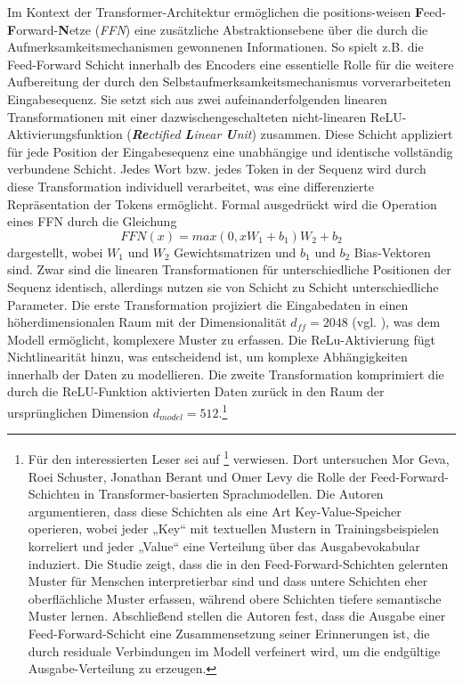 Im Kontext der Transformer-Architektur ermöglichen die positions-weisen \textbf{F}eed-\textbf{F}orward-\textbf{N}etze (\emph{FFN}) eine zusätzliche Abstraktionsebene über die durch die Aufmerksamkeitsmechanismen gewonnenen Informationen. So spielt z.B. die Feed-Forward Schicht innerhalb des Encoders eine essentielle Rolle für die weitere Aufbereitung der durch den Selbstaufmerksamkeitsmechanismus vorverarbeiteten Eingabesequenz. Sie setzt sich aus zwei aufeinanderfolgenden linearen Transformationen mit einer dazwischengeschalteten nicht-linearen ReLU-Aktivierungsfunktion (\emph{\textbf{Re}ctified \textbf{L}inear \textbf{U}nit}) zusammen. Diese Schicht appliziert für jede Position der Eingabesequenz eine unabhängige und identische vollständig verbundene Schicht. Jedes Wort bzw. jedes Token in der Sequenz wird durch diese Transformation individuell verarbeitet, was eine differenzierte Repräsentation der Tokens ermöglicht. Formal ausgedrückt wird die Operation eines FFN durch die Gleichung
\begin{equation}\label{eq:FFN}
	FFN(x) = max(0, xW_1 + b_1)W_2+b_2
\end{equation}
dargestellt, wobei $W_1$ und $W_2$ Gewichtsmatrizen und $b_1$ und $b_2$ Bias-Vektoren sind. Zwar sind die linearen Transformationen für unterschiedliche Positionen der Sequenz identisch, allerdings nutzen sie von Schicht zu Schicht unterschiedliche Parameter. Die erste Transformation projiziert die Eingabedaten in einen höherdimensionalen Raum mit der Dimensionalität $d_{ff}=2048$ (vgl. \cite{Attention_is_all_you_need}), was dem Modell ermöglicht, komplexere Muster zu erfassen. Die ReLu-Aktivierung fügt Nichtlinearität hinzu, was entscheidend ist, um komplexe Abhängigkeiten innerhalb der Daten zu modellieren. Die zweite Transformation komprimiert die durch die ReLU-Funktion aktivierten Daten zurück in den Raum der ursprünglichen Dimension $d_{model}=512$.\footnote{Für den interessierten Leser sei auf \footcite{TransformerFeedForward} verwiesen. Dort untersuchen Mor Geva, Roei Schuster, Jonathan Berant und Omer Levy die Rolle der Feed-Forward-Schichten in Transformer-basierten Sprachmodellen. Die Autoren argumentieren, dass diese Schichten als eine Art Key-Value-Speicher operieren, wobei jeder „Key“ mit textuellen Mustern in Trainingsbeispielen korreliert und jeder „Value“ eine Verteilung über das Ausgabevokabular induziert. Die Studie zeigt, dass die in den Feed-Forward-Schichten gelernten Muster für Menschen interpretierbar sind und dass untere Schichten eher oberflächliche Muster erfassen, während obere Schichten tiefere semantische Muster lernen. Abschließend stellen die Autoren fest, dass die Ausgabe einer Feed-Forward-Schicht eine Zusammensetzung seiner Erinnerungen ist, die durch residuale Verbindungen im Modell verfeinert wird, um die endgültige Ausgabe-Verteilung zu erzeugen.}

